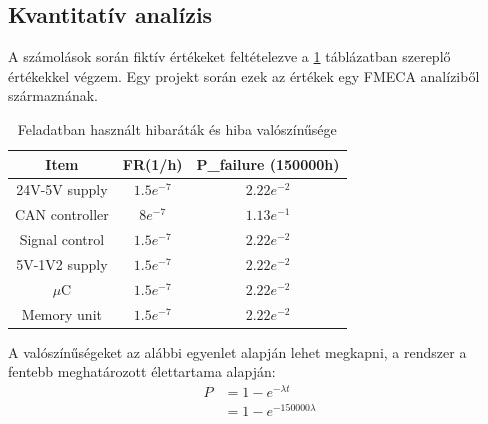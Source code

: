\subsection{Kvantitatív analízis}
A számolások során fiktív értékeket feltételezve a \ref{tab:fmeca} táblázatban szereplő értékekkel végzem.
Egy projekt során ezek az értékek egy FMECA analíziből származnának.

\begin{table}
    \footnotesize
    \centering
    \begin{tabular}{ |c|c|c| }
        \hline
        Item & FR(1/h) & P\_failure (150000h)\\
        \hline
        24V-5V supply & $1.5e^{-7}$&$2.22e^{-2}$ \\
        \hline
        CAN controller & $8e^{-7}$&$1.13e^{-1}$ \\
        \hline
        Signal control & $1.5e^{-7}$&$2.22e^{-2}$ \\
        \hline
        5V-1V2 supply & $1.5e^{-7}$&$2.22e^{-2}$ \\
        \hline
        $\mu$C & $1.5e^{-7}$&$2.22e^{-2}$ \\
        \hline
        Memory unit & $1.5e^{-7}$&$2.22e^{-2}$ \\ 
        \hline
    \end{tabular}
    \caption{Feladatban használt hibaráták és hiba valószínűsége}
    \label{tab:fmeca}
\end{table}

A valószínűségeket az alábbi egyenlet alapján lehet megkapni, a rendszer a fentebb meghatározott élettartama alapján: 
\begin{align}
    P&=1-e^{-\lambda t} \\
    &=1-e^{-150000\lambda}
\end{align}
